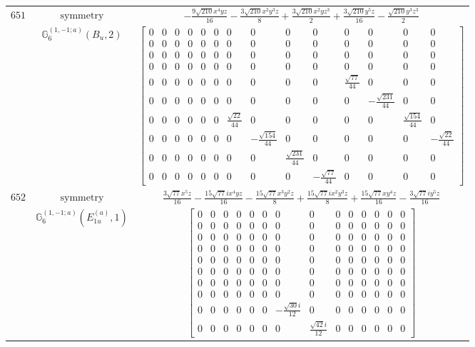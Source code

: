 \documentclass[fleqn,8pt,landscape]{jsarticle}
\begin{document}
\begin{longtable}{ccc}
$ 651 $ & $ \text{symmetry} $ & $ - \frac{9 \sqrt{210} x^{4} y z}{16} - \frac{3 \sqrt{210} x^{2} y^{3} z}{8} + \frac{3 \sqrt{210} x^{2} y z^{3}}{2} + \frac{3 \sqrt{210} y^{5} z}{16} - \frac{\sqrt{210} y^{3} z^{3}}{2} $ \\
$  $ & $ \mathbb{G}_{6}^{(1,-1;a)}(B_{u},2) $ & $ \begin{bmatrix} 0 & 0 & 0 & 0 & 0 & 0 & 0 & 0 & 0 & 0 & 0 & 0 & 0 & 0 \\ 0 & 0 & 0 & 0 & 0 & 0 & 0 & 0 & 0 & 0 & 0 & 0 & 0 & 0 \\ 0 & 0 & 0 & 0 & 0 & 0 & 0 & 0 & 0 & 0 & 0 & 0 & 0 & 0 \\ 0 & 0 & 0 & 0 & 0 & 0 & 0 & 0 & 0 & 0 & 0 & 0 & 0 & 0 \\ 0 & 0 & 0 & 0 & 0 & 0 & 0 & 0 & 0 & 0 & \frac{\sqrt{77}}{44} & 0 & 0 & 0 \\ 0 & 0 & 0 & 0 & 0 & 0 & 0 & 0 & 0 & 0 & 0 & - \frac{\sqrt{231}}{44} & 0 & 0 \\ 0 & 0 & 0 & 0 & 0 & 0 & \frac{\sqrt{22}}{44} & 0 & 0 & 0 & 0 & 0 & \frac{\sqrt{154}}{44} & 0 \\ 0 & 0 & 0 & 0 & 0 & 0 & 0 & - \frac{\sqrt{154}}{44} & 0 & 0 & 0 & 0 & 0 & - \frac{\sqrt{22}}{44} \\ 0 & 0 & 0 & 0 & 0 & 0 & 0 & 0 & \frac{\sqrt{231}}{44} & 0 & 0 & 0 & 0 & 0 \\ 0 & 0 & 0 & 0 & 0 & 0 & 0 & 0 & 0 & - \frac{\sqrt{77}}{44} & 0 & 0 & 0 & 0 \end{bmatrix} $ \\ \hline
$ 652 $ & $ \text{symmetry} $ & $ \frac{3 \sqrt{77} x^{5} z}{16} - \frac{15 \sqrt{77} i x^{4} y z}{16} - \frac{15 \sqrt{77} x^{3} y^{2} z}{8} + \frac{15 \sqrt{77} i x^{2} y^{3} z}{8} + \frac{15 \sqrt{77} x y^{4} z}{16} - \frac{3 \sqrt{77} i y^{5} z}{16} $ \\
$  $ & $ \mathbb{G}_{6}^{(1,-1;a)}(E_{1u}^{(a)},1) $ & $ \begin{bmatrix} 0 & 0 & 0 & 0 & 0 & 0 & 0 & 0 & 0 & 0 & 0 & 0 & 0 & 0 \\ 0 & 0 & 0 & 0 & 0 & 0 & 0 & 0 & 0 & 0 & 0 & 0 & 0 & 0 \\ 0 & 0 & 0 & 0 & 0 & 0 & 0 & 0 & 0 & 0 & 0 & 0 & 0 & 0 \\ 0 & 0 & 0 & 0 & 0 & 0 & 0 & 0 & 0 & 0 & 0 & 0 & 0 & 0 \\ 0 & 0 & 0 & 0 & 0 & 0 & 0 & 0 & 0 & 0 & 0 & 0 & 0 & 0 \\ 0 & 0 & 0 & 0 & 0 & 0 & 0 & 0 & 0 & 0 & 0 & 0 & 0 & 0 \\ 0 & 0 & 0 & 0 & 0 & 0 & 0 & 0 & 0 & 0 & 0 & 0 & 0 & 0 \\ 0 & 0 & 0 & 0 & 0 & 0 & 0 & 0 & 0 & 0 & 0 & 0 & 0 & 0 \\ 0 & 0 & 0 & 0 & 0 & 0 & - \frac{\sqrt{30} i}{12} & 0 & 0 & 0 & 0 & 0 & 0 & 0 \\ 0 & 0 & 0 & 0 & 0 & 0 & 0 & \frac{\sqrt{42} i}{12} & 0 & 0 & 0 & 0 & 0 & 0 \end{bmatrix} $ \\ \hline

\end{longtable}
\end{document}
